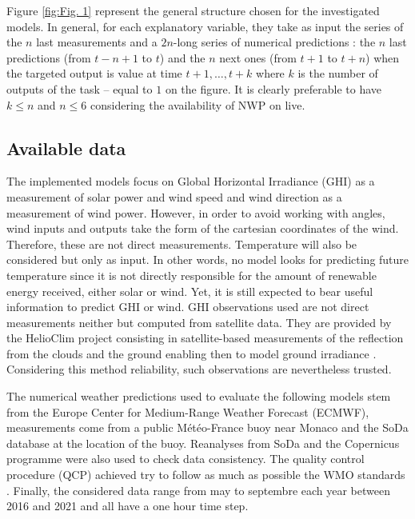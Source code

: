 \documentclass{article}
\newcommand{\saut}{\vspace{10px}}
\begin{document}
\saut

Figure \ref{fig:Fig. 1} represent the general structure chosen for the investigated models. In general, for each
explanatory variable, they take
as input the series of the $n$ last measurements and a $2n$-long series of numerical predictions : the $n$ last
predictions (from $t - n + 1$ to $t$) and the $n$ next ones (from $t + 1$ to $t + n$) when the targeted output is
value at time $t + 1, \dots, t + k$ where $k$ is the number of outputs of the task -- equal to $1$ on the figure.
It is clearly preferable to have $k \leq n$ and $n \leq 6$ considering the availability of NWP on live.


\subsection*{Available data}

The implemented models focus on Global Horizontal Irradiance (GHI) as a measurement of solar power
and wind speed and wind direction as a measurement of wind power.
However, in order to avoid working with angles, wind inputs and outputs
take the form of the cartesian coordinates of the wind. Therefore, these are not direct measurements. Temperature will
also be considered but only as input. In other words, no model looks for predicting future temperature since it is
not directly responsible for the amount of renewable energy received, either solar or wind. Yet, it is still expected to
bear useful information to predict GHI or wind. GHI observations used are not direct measurements neither but
computed from satellite data. They are provided by the HelioClim project consisting in satellite-based measurements
of the reflection from the clouds and the ground enabling then to model ground irradiance
\cite{blanc_helioclim_2011}. Considering this method reliability, such observations are nevertheless trusted.

\saut

The numerical weather predictions used to evaluate the following models 
stem from the Europe Center for Medium-Range Weather Forecast (ECMWF), measurements come from a public
Météo-France buoy near Monaco and the SoDa database at the location of the buoy. Reanalyses from SoDa and
the Copernicus programme were also used to check data consistency. The quality control procedure (QCP) achieved
try to follow as much as possible the WMO standards \cite{organization_wmo_guidelines_2021}. Finally,
the considered data range from may to septembre each year between 2016 and 2021 and all have a one hour
time step.
\end{document}
